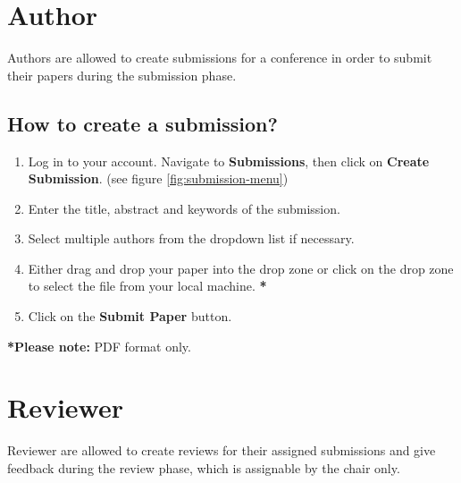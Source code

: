 \documentclass[nochapterpage,nopartpage,noheadingspace,numbersubsubsec,bigchapter,colorback,accentcolor=tud9c,10pt]{tudreport}
\begin{document}
  \chapter{Author}

Authors are allowed to create submissions for a conference in order to submit their papers during the submission phase.

	\section{How to create a submission?}


\begin{enumerate}
	\item	Log in to your account. Navigate to \textbf{Submissions}, then click on \textbf{Create Submission}.  (see figure \ref{fig:submission-menu})
	\item	Enter the title, abstract and keywords of the submission.
	\item	Select multiple authors from the dropdown list if necessary.
	\item	Either drag and drop your paper into the drop zone or click on the drop zone to select the file from your local machine. \textbf{*}
	\item	Click on the \textbf{Submit Paper} button.
\end{enumerate}


\textbf{*Please note:} PDF format only.


  \chapter{Reviewer}

Reviewer are allowed to create reviews for their assigned submissions and give feedback during the review phase, which is assignable by the chair only.
\end{document}
